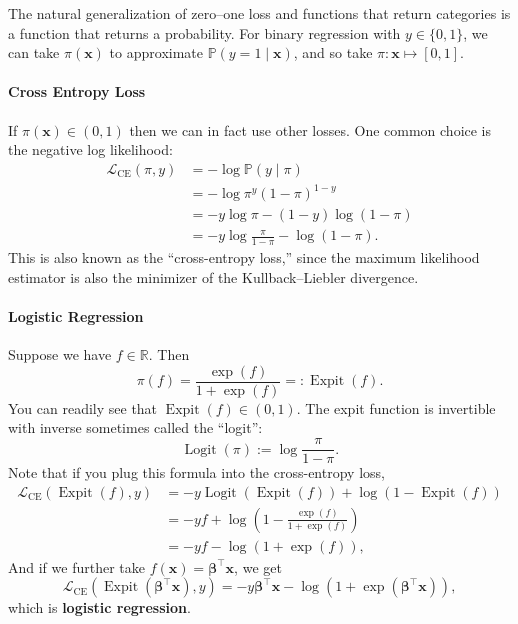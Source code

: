 The natural generalization of zero--one loss and functions that return categories is a function that returns a probability. For binary regression with $y \in \{0, 1\}$, we can take $\pi(\mathbf{x})$ to approximate $\mathbb{P}(y = 1 \mid \mathbf{x})$, and so take $\pi: \mathbf{x} \mapsto [0, 1]$.

\paragraph{Cross Entropy Loss}
If $\pi(\mathbf{x}) \in (0, 1)$ then we can in fact use other losses. One common choice is the negative log likelihood:
\begin{align*}
\mathscr{L}_{\text{CE}}(\pi, y)
&= -\log \mathbb{P}(y \mid \pi) \\
&= -\log \pi^{y}(1 - \pi)^{1-y} \\
&= -y \log \pi - (1-y) \log(1 - \pi) \\
&= -y \log \frac{\pi}{1 - \pi} - \log(1 - \pi).
\end{align*}
This is also known as the ``cross-entropy loss,'' since the maximum likelihood estimator is also the minimizer of the Kullback--Liebler divergence.

\paragraph{Logistic Regression}
Suppose we have $f \in \mathbb{R}$. Then
\begin{equation*}
\pi(f) = \frac{\exp(f)}{1 + \exp(f)} =: \operatorname{Expit}(f).
\end{equation*}
You can readily see that $\operatorname{Expit}(f) \in (0, 1)$.
The expit function is invertible with inverse sometimes called the ``logit'':
\begin{equation*}
\operatorname{Logit}(\pi) := \log \frac{\pi}{1 - \pi}.
\end{equation*}
Note that if you plug this formula into the cross-entropy loss,
\begin{align*}
\mathscr{L}_{\text{CE}}(\operatorname{Expit}(f), y)
&= -y \operatorname{Logit}(\operatorname{Expit}(f)) + \log(1 - \operatorname{Expit}(f)) \\
&= -y f + \log\!\left(1 - \frac{\exp(f)}{1 + \exp(f)}\right) \\
&= -y f - \log(1 + \exp(f)),
\end{align*}
And if we further take $f(\mathbf{x}) = \mathbf{\beta}^{\top} \mathbf{x}$, we get
\begin{equation*}
\mathscr{L}_{\text{CE}}(\operatorname{Expit}(\mathbf{\beta}^{\top}\mathbf{x}), y) = -y \mathbf{\beta}^{\top} \mathbf{x} - \log(1 + \exp(\mathbf{\beta}^{\top}\mathbf{x})),
\end{equation*}
which is \textbf{logistic regression}.

